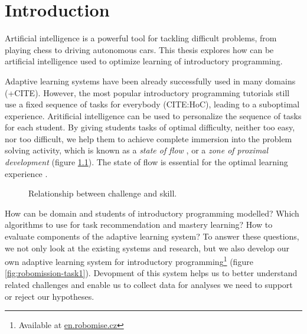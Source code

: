 \chapter{Introduction}
\label{chap:introduction}

Artificial intelligence is a powerful tool for tackling difficult problems,
from playing chess to driving autonomous cars.
This thesis explores how can be artificial intelligence used to optimize
learning of introductory programming.

Adaptive learning systems have been already successfully used in many domains
\cite{alg.evaluation-geography} (+CITE).
However, the most popular introductory programming tutorials still use
a fixed sequence of tasks for everybody (CITE:HoC), leading to a suboptimal experience.
Aritificial intelligence can be used to personalize the sequence of tasks
for each student.
By giving students tasks of optimal difficulty, neither too easy, nor too
difficult, we help them to achieve complete immersion into the problem solving
activity, which is known as a \emph{state of flow} \cite{flow},
or a \emph{zone of proximal development} \cite{zone-of-proximal-development}
(figure \ref{fig:flow}).
The state of flow is essential for the optimal learning experience
\cite{adaptive-practice}.

\begin{figure}[htb]
  \centering
  \caption{Relationship between challenge and skill.}
  \label{fig:flow}
\end{figure}


How can be domain and students of introductory programming modelled?
Which algorithms to use for task recommendation and mastery learning?
How to evaluate components of the adaptive learning system?
To answer these questions, we not only look at the existing systems
and research, but we also develop our own adaptive learning system for
introductory programming\footnote{Available at \url{en.robomise.cz}}
(figure \ref{fig:robomission-task1}).
Devopment of this system helps us to better understand related challenges
and enable us to collect data for analyses we need to support or reject our hypotheses.

